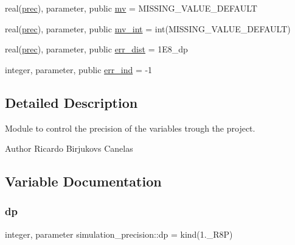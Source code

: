 \begin{DoxyCompactItemize}
\item 
real(\mbox{\hyperlink{namespacesimulation__precision_a6d3bcd3b4ff2cfb92ec9fe36ecad405b}{prec}}), parameter, public \mbox{\hyperlink{namespacesimulation__precision_a4416a112b4fc53848f9f18fe5e9003db}{mv}} = M\+I\+S\+S\+I\+N\+G\+\_\+\+V\+A\+L\+U\+E\+\_\+\+D\+E\+F\+A\+U\+LT
\item 
real(\mbox{\hyperlink{namespacesimulation__precision_a6d3bcd3b4ff2cfb92ec9fe36ecad405b}{prec}}), parameter, public \mbox{\hyperlink{namespacesimulation__precision_ae23a853ee1499839ea702b3c01e443fc}{mv\+\_\+int}} = int(M\+I\+S\+S\+I\+N\+G\+\_\+\+V\+A\+L\+U\+E\+\_\+\+D\+E\+F\+A\+U\+LT)
\item 
real(\mbox{\hyperlink{namespacesimulation__precision_a6d3bcd3b4ff2cfb92ec9fe36ecad405b}{prec}}), parameter, public \mbox{\hyperlink{namespacesimulation__precision_acb6a32a47c43de36b53bb8033aa2738e}{err\+\_\+dist}} = 1\+E8\+\_\+dp
\item 
integer, parameter, public \mbox{\hyperlink{namespacesimulation__precision_a531d4e8c47b468cf4212393a5b84c7c8}{err\+\_\+ind}} = -\/1
\end{DoxyCompactItemize}


\subsection{Detailed Description}
Module to control the precision of the variables trough the project. 

\begin{DoxyAuthor}{Author}
Ricardo Birjukovs Canelas 
\end{DoxyAuthor}


\subsection{Variable Documentation}
\mbox{\label{namespacesimulation__precision_af01fc62f503e0ff9a95c9ee2960c9a7f}} 
\subsubsection{\texorpdfstring{dp}{dp}}
{\footnotesize\ttfamily integer, parameter simulation\+\_\+precision\+::dp = kind(1.\+\_\+\+R8P)\hspace{0.3cm}{\ttfamily [private]}}



